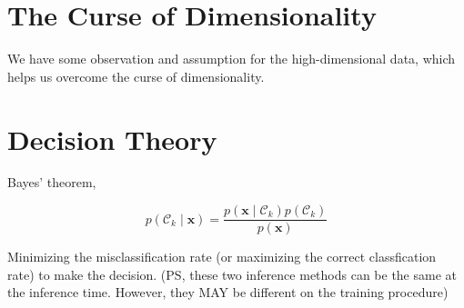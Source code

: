 \documentclass[11pt,en,cite=authoryear]{elegantpaper}
\begin{document}


\section{The Curse of Dimensionality}
We have some observation and assumption for the high-dimensional data, which helps us overcome the curse of dimensionality.


\section{Decision Theory}
Bayes’ theorem,

$$
p\left(\mathcal{C}_{k} \mid \mathbf{x}\right)=\frac{p\left(\mathbf{x} \mid \mathcal{C}_{k}\right) p\left(\mathcal{C}_{k}\right)}{p(\mathbf{x})}
$$

Minimizing the misclassiﬁcation rate (or maximizing the correct classfication rate) to make the decision.
(PS, these two inference methods can be the same at the inference time.  However, they MAY be different on the training procedure)
\end{document}
